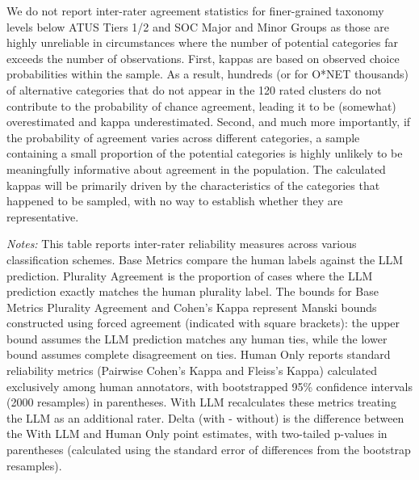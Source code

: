 \documentclass[11pt,a4paper]{article}
\begin{document}
We do not report inter-rater agreement statistics for finer-grained taxonomy levels below ATUS Tiers 1/2 and SOC Major and Minor Groups as those are highly unreliable in circumstances where the number of potential categories far exceeds the number of observations. First, kappas are based on observed choice probabilities within the sample. As a result, hundreds (or for O*NET thousands) of alternative categories that do not appear in the 120 rated clusters do not contribute to the probability of chance agreement, leading it to be (somewhat) overestimated and kappa underestimated.  Second, and much more importantly,  if the probability of agreement varies across different categories, a sample containing a small proportion of the potential categories is highly unlikely to be meaningfully informative about agreement in the population. The calculated kappas will be primarily driven by the characteristics of the categories that happened to be sampled, with no way to establish whether they are representative.   

\begin{table}[htbp]
    \centering
    \caption{Inter-Rater Agreement With Human and LLM Raters}
    \label{rateragreement}
    
    
    \vspace{0.2cm}
    
    \parbox{\textwidth}{\footnotesize \textit{Notes:}  This table reports inter-rater reliability measures across various classification schemes. Base Metrics compare the human labels against the LLM prediction. Plurality Agreement is the proportion of cases where the LLM prediction exactly matches the human plurality label. The bounds for Base Metrics Plurality Agreement and Cohen's Kappa represent Manski bounds constructed using forced agreement (indicated with square brackets): the upper bound assumes the LLM prediction matches any human ties, while the lower bound assumes complete disagreement on ties. Human Only reports standard reliability metrics (Pairwise Cohen's Kappa and Fleiss's Kappa) calculated exclusively among human annotators, with bootstrapped 95\% confidence intervals (2000 resamples) in parentheses. With LLM recalculates these metrics treating the LLM as an additional rater. Delta (with - without) is the difference between the With LLM and Human Only point estimates, with two-tailed p-values in parentheses (calculated using the standard error of differences from the bootstrap resamples).}
\end{table}
\end{document}
